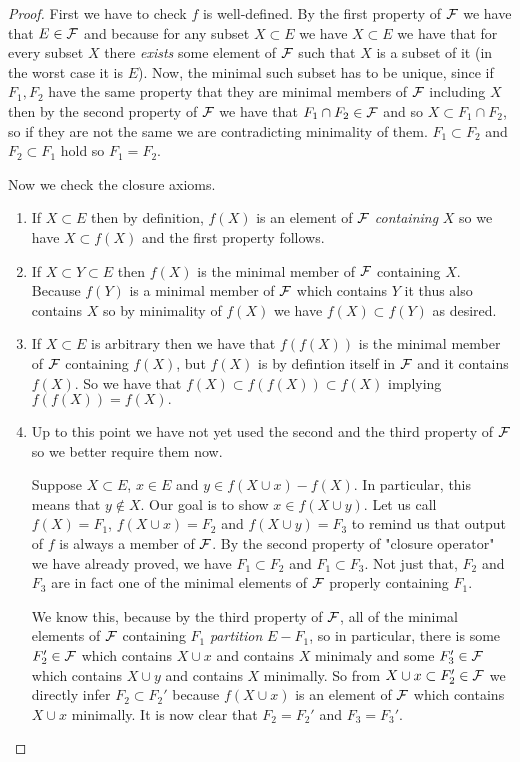 \begin{proof}
    First we have to check $f$ is well-defined. By the first property of $\mathcal{F}$ we have that $E \in \mathcal{F}$ and because for any subset $X \subset E$ we have $X \subset E$ we have that for every subset $X$ there \textit{exists} some element of $\mathcal{F}$ such that $X$ is a subset of it (in the worst case it is $E$). Now, the minimal such subset has to be unique, since if $F_1, F_2$ have the same property that they are minimal members of $\mathcal{F}$ including $X$ then by the second property of $\mathcal{F}$ we have that $F_1 \cap F_2 \in \mathcal{F}$ and so $X \subset F_1\cap F_2$, so if they are not the same we are contradicting minimality of them. $ F_1 \subset F_2$ and $F_2 \subset F_1$ hold so $F_1 = F_2.$

    Now we check the closure axioms.

\begin{enumerate}
    \item If $X \subset E$ then by definition, $f(X)$ is an element of $\mathcal{F}$ \textit{containing} $X$ so we have $X \subset f(X)$ and the first property follows.
    
    \item If $X \subset Y \subset E$ then $f(X)$ is the minimal member of $\mathcal{F}$ containing $X$. Because $f(Y)$ is a minimal member of $\mathcal{F}$ which contains $Y$ it thus also contains $X$ so by minimality of $f(X)$ we have $f(X)\subset f(Y)$ as desired.

    \item If $X \subset E$ is arbitrary then we have that $f(f(X))$ is the minimal member of $\mathcal{F}$ containing $f(X)$, but $f(X)$ is by defintion itself in $\mathcal{F}$ and it contains $f(X)$. So we have that $f(X) \subset f(f(X)) \subset f(X)$ implying $f(f(X)) = f(X).$

    \item Up to this point we have not yet used the second and the third property of $\mathcal{F}$ so we better require them now.

     Suppose $X \subset E$, $x \in E$ and $y \in f(X \cup x) - f(X)$. In particular, this means that $y \notin X$.
   Our goal is to show $x \in f(X \cup y)$. Let us call $f(X) = F_1$, $f(X \cup x) = F_2$ and $f(X \cup y) = F_3$ to remind us that output of $f$ is always a member of $\mathcal{F}$. By the second property of "closure operator" we have already proved, we have $F_1 \subset F_2$ and $F_1 \subset F_3$. Not just that, $F_2$ and $F_3$ are in fact one of the minimal elements of $\mathcal{F}$ properly containing $F_1$.

     We know this, because by the third property of $\mathcal{F}$, all of the minimal elements of $\mathcal{F}$ containing $F_1$ \textit{partition} $E-F_1$, so in particular, there is some $F_2' \in \mathcal{F}$ which contains $X\cup x$ and contains $X$ minimaly and some $F_3' \in \mathcal{F}$ which contains $X \cup y$ and contains $X$ minimally. So from $X \cup x \subset F_2' \in \mathcal{F}$ we directly infer $F_2 \subset F_2'$ because $f(X \cup x)$ is an element of $\mathcal{F}$ which contains $X \cup x$ minimally. It is now clear that $F_2= F_2'$ and $F_3 = F_3'$.



\end{enumerate}
\end{proof}
